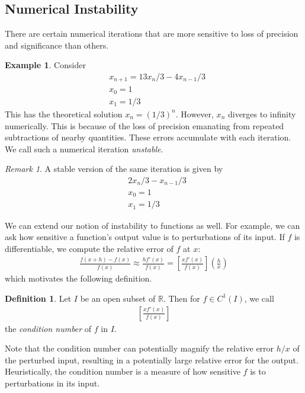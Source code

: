 \documentclass[12pt]{article}
\newcommand{\rr}{\mathbb{R}}
\theoremstyle{plain}
\theoremstyle{definition}
\newtheorem*{definition}{Definition}
\newtheorem*{example}{Example}
\theoremstyle{remark}
\newtheorem*{remark}{Remark}
\numberwithin{equation}{section}  %
\begin{document}
\subsection{Numerical Instability}
There are certain numerical iterations that are more sensitive
to loss of precision and significance than others.
\begin{example}
	Consider
	\begin{align*}
		& x_{n+1} = 13x_n/3 - 4x_{n-1}/3
		\\
		& x_0 = 1
		\\
		& x_1 = 1/3
	\end{align*}
	This has the theoretical solution $x_n = (1/3)^n$. However,
	$x_n$ diverges to infinity numerically. This is because of the loss of precision
	emanating from repeated subtractions of nearby quantities. These
	errors accumulate with each iteration. We call such a numerical iteration
	\emph{unstable}.
\end{example}
\begin{remark}
	A stable version of the same iteration is given by
	\begin{align*}
		& 2 x_n /3 - x_{n-1}/3
		\\
		& x_0 = 1
		\\
		& x_1 = 1/3
	\end{align*}
\end{remark}
We can extend our notion of instability to functions as well.
For example, we can ask how sensitive a function's output value is
to perturbations of its input. If $f$ is differentiable, we compute
the relative error of $f$ at $x$:
\begin{align*}
	\frac{f(x + h) - f(x)}{f(x)} \approx \frac{h f'(x)}{f(x)} = 
	\left[ \frac{x f'(x)}{f(x)}\right]\left( \frac{h}{x}\right)
\end{align*}
which motivates the following definition.
\begin{definition}
	Let $I$ be an open subset of $\rr$. Then for $f \in C^1(I)$, 
	we call 
	\begin{align*}
		\left[ \frac{x f'(x)}{f(x)}\right]
	\end{align*}
	the \emph{condition number} of $f$ in $I$.
\end{definition}
Note that the condition number can potentially magnify
the relative error $h/x$ of the perturbed input, resulting
in a potentially large relative error for the output. Heuristically,
the condition number is a measure of how sensitive $f$ is to perturbations
in its input.
\end{document}
